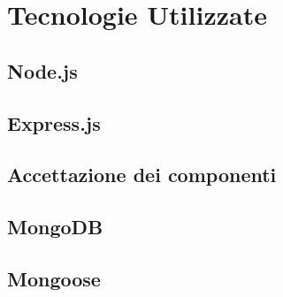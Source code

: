 \section{Tecnologie Utilizzate}
	\subsection{Node.js}

	\subsection{Express.js}

	\subsection{Accettazione dei componenti}

	\subsection{MongoDB}

	\subsection{Mongoose}
